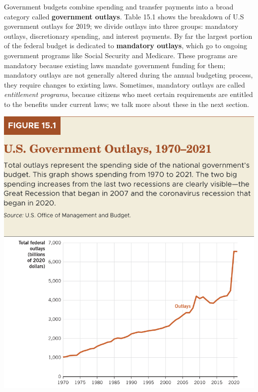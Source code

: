 \documentclass[11pt]{article} %
\begin{document}
Government budgets combine spending and transfer payments into a broad category called \textbf{government outlays}. Table 15.1 shows the breakdown of U.S government outlays for 2019; we divide outlays into three groups: mandatory outlays, discretionary spending, and interest payments. By far the largest portion of the federal budget is dedicated to \textbf{mandatory outlays}, which go to ongoing government programs like Social Security and Medicare. These programs are mandatory because existing laws mandate government funding for them; mandatory outlays are not generally altered during the annual budgeting process, they require changes to existing laws. Sometimes, mandatory outlays are called \textit{entitlement programs}, because citizens who meet certain requirements are entitled to the benefits under current laws; we talk more about these in the next section.
\begin{center}
\includegraphics[scale=0.5]{images/Figure 15.1.png} 
\end{center}
\end{document}
